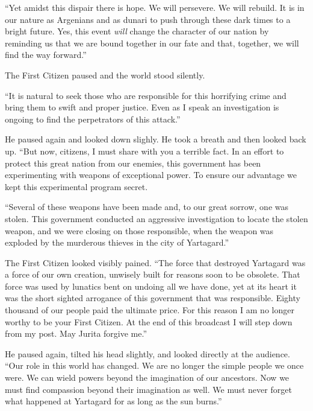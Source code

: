 
``Yet amidst this dispair there is hope. We will persevere. We will rebuild. It is in our nature
as Argenians and as dunari to push through these dark times to a bright future. Yes, this event
\emph{will} change the character of our nation by reminding us that we are bound together in our
fate and that, together, we will find the way forward.''

The First Citizen paused and the world stood silently.

``It is natural to seek those who are responsible for this horrifying crime and bring them to
swift and proper justice. Even as I speak an investigation is ongoing to find the perpetrators
of this attack.''

He paused again and looked down slighly. He took a breath and then looked back up. ``But now,
citizens, I must share with you a terrible fact. In an effort to protect this great nation from
our enemies, this government has been experimenting with weapons of exceptional power. To ensure
our advantage we kept this experimental program secret.

``Several of these weapons have been made and, to our great sorrow, one was stolen. This
government conducted an aggressive investigation to locate the stolen weapon, and we were
closing on those responsible, when the weapon was exploded by the murderous thieves in the city
of Yartagard.''

The First Citizen looked visibly pained. ``The force that destroyed Yartagard was a force of our
own creation, unwisely built for reasons soon to be obsolete. That force was used by lunatics
bent on undoing all we have done, yet at its heart it was the short sighted arrogance of this
government that was responsible. Eighty thousand of our people paid the ultimate price. For this
reason I am no longer worthy to be your First Citizen. At the end of this broadcast I will step
down from my post. May Jurita forgive me.''


He paused again, tilted his head slightly, and looked directly at the audience. ``Our role in
this world has changed. We are no longer the simple people we once were. We can wield powers
beyond the imagination of our ancestors. Now we must find compassion beyond their imagination as
well. We must never forget what happened at Yartagard for as long as the sun burns.''
